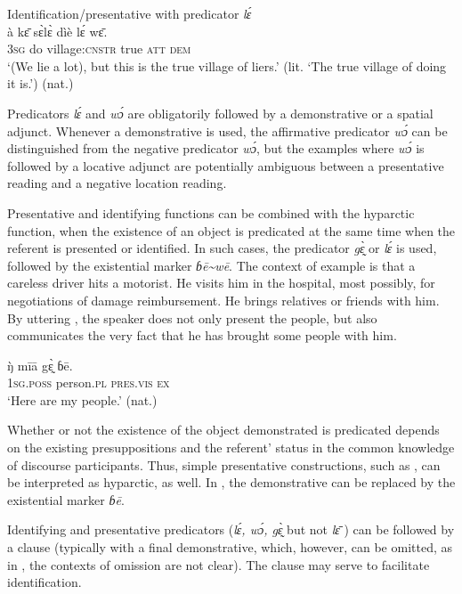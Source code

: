 \documentclass[output=paper,colorlinks,citecolor=brown]{langscibook}
\begin{document}
\ea\label{ex:mano:45} Identification/presentative with predicator \textit{lɛ́}\\
    \gll à kɛ̄ sɛ̀lɛ̀ dìè lɛ́ wɛ̄.\\
         3\textsc{sg} do village\textsc{:cnstr} true \textsc{att} \textsc{dem}    \\
    \glt ‘(We lie a lot), but this is the true village of liers.’ (lit. ‘The true village of doing it is.’) (nat.)
\z

Predicators \textit{lɛ́} and \textit{wɔ́} are obligatorily followed by a demonstrative or a spatial adjunct. Whenever a demonstrative is used, the affirmative predicator \textit{wɔ́} can be distinguished from the negative predicator \textit{wɔ́}, but the examples where \textit{wɔ́} is followed by a locative adjunct are potentially ambiguous between a presentative reading and a negative location reading. 

Presentative and identifying functions can be combined with the hyparctic function, when the existence of an object is predicated at the same time when the referent is presented or identified. In such cases, the predicator \textit{gɛ̰̀} or \textit{lɛ́ } is used, followed by the existential marker \textit{ɓē{\textasciitilde}wē}. The context of example  is that a careless driver hits a motorist. He visits him in the hospital, most possibly, for negotiations of damage reimbursement. He brings relatives or friends with him. By uttering , the speaker does not only present the people, but also communicates the very fact that he has brought some people with him. 

\ea\label{ex:mano:46}
    \gll ŋ̀ mīā gɛ̰̀ ɓē. \\
         \textsc{1sg.poss} person.\textsc{pl} \textsc{pres.vis} \textsc{ex}\\
    \glt ‘Here are my people.’ (nat.)
\z

Whether or not the existence of the object demonstrated is predicated depends on the existing presuppositions and the referent’ status in the common knowledge of discourse participants. Thus, simple presentative constructions, such as , can be interpreted as hyparctic, as well. In , the demonstrative can be replaced by the existential marker \textit{ɓē}.

Identifying and presentative predicators (\textit{lɛ́, wɔ́, gɛ̰̀} but not \textit{lɛ̄ }) can be followed by a clause (typically with a final demonstrative, which, however, can be omitted, as in , the contexts of omission are not clear). The clause may serve to facilitate identification.
\end{document}
